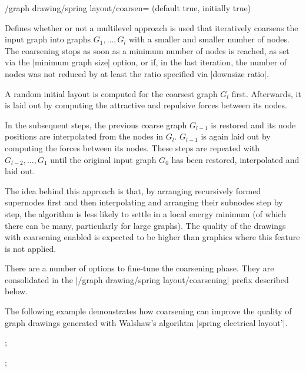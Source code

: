 
\begin{key}{/graph drawing/spring layout/coarsen=
  (default true, initially true)}

  Defines whether or not a multilevel approach is used that
  iteratively coarsens the input graph into graphs $G_1,\dots,G_l$ with 
  a smaller and smaller number of nodes. The coarsening stops as soon as
  a minimum number of nodes is reached, as set via the 
  |minimum graph size| option, or if, in the last iteration, the 
  number of nodes was not reduced by at least the ratio specified via 
  |downsize ratio|. 

  A random initial layout is computed for the coarsest graph $G_l$ first.
  Afterwards, it is laid out by computing the attractive and repulsive
  forces between its nodes. 
  
  In the subsequent steps, the previous coarse graph $G_{l-1}$ is 
  restored and its node positions are interpolated from the nodes in 
  $G_l$. $G_{l-1}$ is again laid out by computing the forces between 
  its nodes. These steps are repeated with $G_{l-2},\dots,G_1$ until 
  the original input graph $G_0$ has been restored, interpolated 
  and laid out.

  The idea behind this approach is that, by arranging recursively 
  formed supernodes first and then interpolating and arranging their
  subnodes step by step, the algorithm is less likely to settle in a
  local energy minimum (of which there can be many, particularly for
  large graphs). The quality of the drawings with coarsening enabled is
  expected to be higher than graphics where this feature is not applied.

  There are a number of options to fine-tune the coarsening phase.
  They are consolidated in the |/graph drawing/spring layout/coarsening|
  prefix described below.

  The following example demonstrates how coarsening can improve the
  quality of graph drawings generated with Walshaw's algorihtm 
  |spring electrical layout'|.
  \begin{codeexample}[width=5cm]
\tikz {};

\tikz {};
  \end{codeexample}
\end{key}

